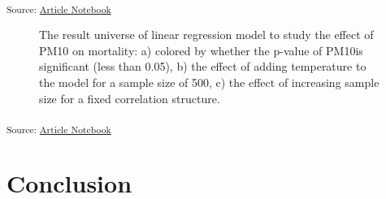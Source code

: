 \documentclass[
]{jds}
\begin{document}
\textsubscript{Source:
\href{https://huizezhang-sherry.github.io/paper-analysis-plan/index.qmd.html}{Article
Notebook}}

\label{cell-fig-result-universe}
\begin{figure}[H]


\caption{\label{fig-result-universe}The result universe of linear
regression model to study the effect of PM10 on mortality: a) colored by
whether the p-value of PM10is significant (less than 0.05), b) the
effect of adding temperature to the model for a sample size of 500, c)
the effect of increasing sample size for a fixed correlation structure.}

\end{figure}%

\textsubscript{Source:
\href{https://huizezhang-sherry.github.io/paper-analysis-plan/index.qmd.html}{Article
Notebook}}

\section{Conclusion}\label{sec-conclusion}


\renewcommand\refname{References}
  
\end{document}
